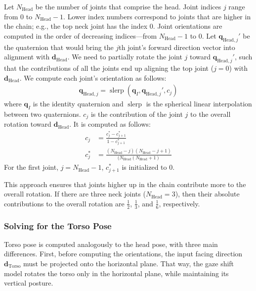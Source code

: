 Let $N_{\mathrm{Head}}$ be the number of joints that comprise the head. Joint indices $j$ range from 0 to $N_{\mathrm{Head}} - 1$. Lower index numbers correspond to joints that are higher in the chain; e.g., the top neck joint has the index 0. Joint orientations are computed in the order of decreasing indices---from $N_{\mathrm{Head}} - 1$ to 0. Let $\mathbf{q}_{\mathrm{Head},j}'$ be the quaternion that would bring the $j$th joint's forward direction vector into alignment with $\mathbf{d}_{\mathrm{Head}}$. We need to partially rotate the joint $j$ toward $\mathbf{q}_{\mathrm{Head},j}'$, such that the contributions of all the joints end up aligning the top joint ($j = 0$) with $\mathbf{d}_{\mathrm{Head}}$. We compute each joint's orientation as follows:
%
\begin{align}
\label{eq:GazeShiftJointOrientation}
\mathbf{q}_{\mathrm{Head},j} = \mathop{slerp}(\mathbf{q}_I, \mathbf{q}_{\mathrm{Head},j}', c_j)
\end{align}
%
where $\mathbf{q}_I$ is the identity quaternion and $\mathop{slerp}$ is the spherical linear interpolation between two quaternions. $c_j$ is the contribution of the joint $j$ to the overall rotation toward $\mathbf{d}_{\mathrm{Head}}$. It is computed as follows:
%
\begin{align}
\label{eq:GazeShiftJointContribution}
c_j &= \frac{c_j^* - c_{j+1}^*}{1 - c_{j+1}^*} \\
c_j^* &= \frac{(N_{\mathrm{Head}} - j)(N_{\mathrm{Head}} - j + 1)}{(N_{\mathrm{Head}} (N_{\mathrm{Head}} + 1)}
\end{align}
%
For the first joint, $j = N_{\mathrm{Head}} - 1$, $c_{j+1}^*$ is initialized to 0.

This approach ensures that joints higher up in the chain contribute more to the overall rotation. If there are three neck joints ($N_{\mathrm{Head}} = 3$), then their absolute contributions to the overall rotation are $\frac{1}{2}$, $\frac{1}{3}$, and $\frac{1}{6}$, respectively.

\subsubsection{Solving for the Torso Pose}

Torso pose is computed analogously to the head pose, with three main differences. First, before computing the orientations, the input facing direction $\mathbf{d}_{\mathrm{Torso}}$ must be projected onto the horizontal plane. That way, the gaze shift model rotates the torso only in the horizontal plane, while maintaining its vertical posture.


